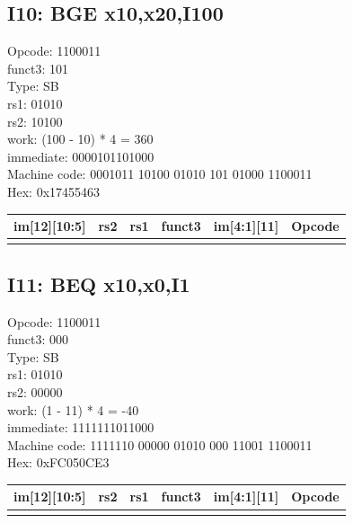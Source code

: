 \documentclass{article}
\begin{document}
\subsection*{I10:   BGE x10,x20,I100}

Opcode: 1100011\\
funct3: 101\\
Type: SB\\
rs1: 01010\\
rs2: 10100\\
work: (100 - 10) * 4 = 360\\
immediate: 0000101101000\\
Machine code: 0001011 10100 01010 101 01000 1100011\\
Hex: 0x17455463\\

\begin{center}
	\begin{tabularx}{1.15\textwidth} { 
		| >{\centering\arraybackslash}X 
		| >{\centering\arraybackslash}X 
		| >{\centering\arraybackslash}X 
		| >{\centering\arraybackslash}X
        | >{\centering\arraybackslash}X
		| >{\centering\arraybackslash}X | }
	   \hline
	   	im[12][10:5] & rs2 & rs1 & funct3 & im[4:1][11] & Opcode \\
	   \hline
	   0001011  & 10100  & 01010 & 101 & 01000 & 1100011 \\
	  \hline
	\end{tabularx}
\end{center}

\subsection*{I11:   BEQ x10,x0,I1}

Opcode: 1100011\\
funct3: 000\\
Type: SB\\
rs1: 01010\\
rs2: 00000\\
work: (1 - 11) * 4 = -40\\
immediate: 1111111011000\\
Machine code: 1111110 00000 01010 000 11001 1100011\\
Hex: 0xFC050CE3\\

\begin{center}
    \begin{tabularx}{1.15\textwidth} { 
        | >{\centering\arraybackslash}X 
        | >{\centering\arraybackslash}X 
        | >{\centering\arraybackslash}X 
        | >{\centering\arraybackslash}X
        | >{\centering\arraybackslash}X
        | >{\centering\arraybackslash}X | }
       \hline
       	im[12][10:5] & rs2 & rs1 & funct3 & im[4:1][11] & Opcode \\
       \hline
       1111110  & 00000  & 01010 & 000 & 11001 & 1100011 \\
      \hline
    \end{tabularx}
\end{center}
\end{document}
